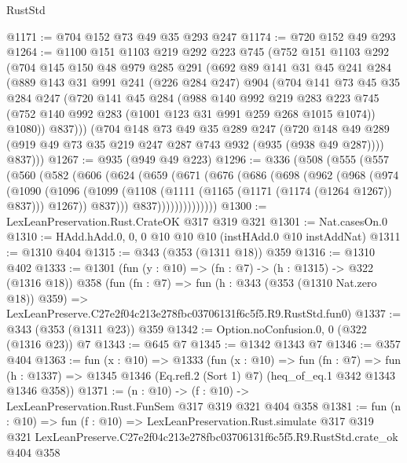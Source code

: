 \begin{lexlean}{RustStd}
\begin{coremodule}
@1171 := @704 @152 @73 @49 @35 @293 @247
@1174 := @720 @152 @49 @293
@1264 := @1100
    @151
    @1103
    @219
    @292
    @223
    @745
    (@752
      @151
      @1103
      @292
      (@704
        @145
        @150
        @48
        @979
        @285
        @291
        (@692
          @89
          @141
          @31
          @45
          @241
          @284
          (@889
            @143
            @31
            @991
            @241
            (@226 @284 @247)
            @904
            (@704
              @141
              @73
              @45
              @35
              @284
              @247
              (@720
                @141
                @45
                @284
                (@988
                  @140
                  @992
                  @219
                  @283
                  @223
                  @745
                  (@752 @140 @992 @283 (@1001 @123 @31 @991 @259 @268 @1015 @1074))
                  @1080))
              @837)))
        (@704
          @148
          @73
          @49
          @35
          @289
          @247
          (@720 @148 @49 @289 (@919 @49 @73 @35 @219 @247 @287 @743 @932 (@935 (@938 @49 @287))))
          @837)))
@1267 := @935 (@949 @49 @223)
@1296 := @336
    (@508
      (@555
        (@557
          (@560
            (@582
              (@606
                (@624
                  (@659
                    (@671
                      (@676
                        (@686
                          (@698
                            (@962
                              (@968
                                (@974
                                  (@1090
                                    (@1096
                                      (@1099
                                        (@1108
                                          (@1111 (@1165 (@1171 (@1174 (@1264 @1267)) @837)))
                                          @1267))
                                      @837)))
                                @837))))))))))))))
@1300 := LexLeanPreservation.Rust.CrateOK @317 @319 @321
@1301 := Nat.casesOn.{0}
@1310 := HAdd.hAdd.{0, 0, 0} @10 @10 @10 (instHAdd.{0} @10 instAddNat)
@1311 := @1310 @404
@1315 := @343 (@353 (@1311 @18)) @359
@1316 := @1310 @402
@1333 := @1301
    (fun (y : @10) => (fn : @7) -> (h : @1315) -> @322 (@1316 @18))
    @358
    (fun (fn : @7) =>
    fun (h : @343 (@353 (@1310 Nat.zero @18)) @359) =>
    LexLeanPreserve.C27e2f04c213e278fbc03706131f6c5f5.R9.RustStd.fun0)
@1337 := @343 (@353 (@1311 @23)) @359
@1342 := Option.noConfusion.{0, 0} (@322 (@1316 @23)) @7
@1343 := @645 @7
@1345 := @1342 @1343 @7
@1346 := @357 @404
@1363 := fun (x : @10) =>
  @1333
    (fun (x : @10) =>
    fun (fn : @7) =>
    fun (h : @1337) => @1345 @1346 (Eq.refl.{2} (Sort 1) @7) (heq_of_eq.{1} @342 @1343 @1346 @358))
@1371 := (n : @10) -> (f : @10) -> LexLeanPreservation.Rust.FunSem @317 @319 @321 @404 @358
@1381 := fun (n : @10) =>
  fun (f : @10) =>
  LexLeanPreservation.Rust.simulate
    @317
    @319
    @321
    LexLeanPreserve.C27e2f04c213e278fbc03706131f6c5f5.R9.RustStd.crate_ok
    @404
    @358
\end{coremodule}
\end{lexlean}
